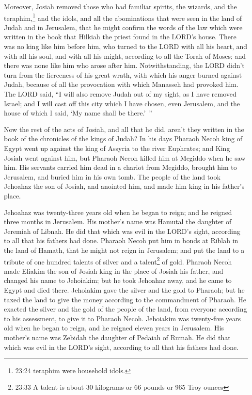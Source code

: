 \myverse{}Moreover, Josiah removed those who had familiar spirits, the
wizards, and the teraphim,\footnote{23:24 teraphim were household idols.} and the idols, and all the abominations that were seen
in the land of Judah and in Jerusalem, that he might confirm the words of the law which were written in
the book that Hilkiah the priest found in the LORD’s house.
\myverse{}There was no king like him before him, who turned to the LORD with all his
heart, and with all his soul, and with all his might, according to all the Torah of Moses; and there was
none like him who arose after him.
\myverse{}Notwithstanding, the LORD didn’t turn from the fierceness of his great wrath,
with which his anger burned against Judah, because of all the provocation with which Manasseh had provoked
him.
\myverse{}The LORD said, “I will also remove Judah out of my sight, as I have removed
Israel; and I will cast off this city which I have chosen, even Jerusalem, and the house of which I said,
‘My name shall be there.’ ”

\myverse{}Now the rest of the acts of Josiah, and all that he did, aren’t
they written in the book of the chronicles of the kings of Judah?
\myverse{}In his days Pharaoh Necoh king of Egypt went up against the king of Assyria
to the river Euphrates; and King Josiah went against him, but Pharaoh Necoh killed him at Megiddo when
he saw him.
\myverse{}His servants carried him dead in a chariot from Megiddo, brought him to Jerusalem,
and buried him in his own tomb. The people of the land took Jehoahaz the son of Josiah, and anointed him,
and made him king in his father’s place.

\myverse{}Jehoahaz was twenty-three years old when he began to reign;
and he reigned three months in Jerusalem. His mother’s name was Hamutal the daughter of Jeremiah of Libnah.
\myverse{}He did that which was evil in the LORD’s sight, according to all that his
fathers had done.
\myverse{}Pharaoh Necoh put him in bonds at Riblah in the land of Hamath, that he might
not reign in Jerusalem; and put the land to a tribute of one hundred talents of silver and a talent\footnote{23:33 A talent is about 30 kilograms or 66 pounds or 965 Troy ounces} of gold.
\myverse{}Pharaoh Necoh made Eliakim the son of Josiah king in the place of Josiah
his father, and changed his name to Jehoiakim; but he took Jehoahaz away, and he came to Egypt and died
there.
\myverse{}Jehoiakim gave the silver and the gold to Pharaoh; but he taxed the land
to give the money according to the commandment of Pharaoh. He exacted the silver and the gold of the people
of the land, from everyone according to his assessment, to give it to Pharaoh Necoh.
\myverse{}Jehoiakim was twenty-five years old when he began to reign, and he reigned
eleven years in Jerusalem. His mother’s name was Zebidah the daughter of Pedaiah of Rumah.
\myverse{}He did that which was evil in the LORD’s sight, according to all that his
fathers had done.


